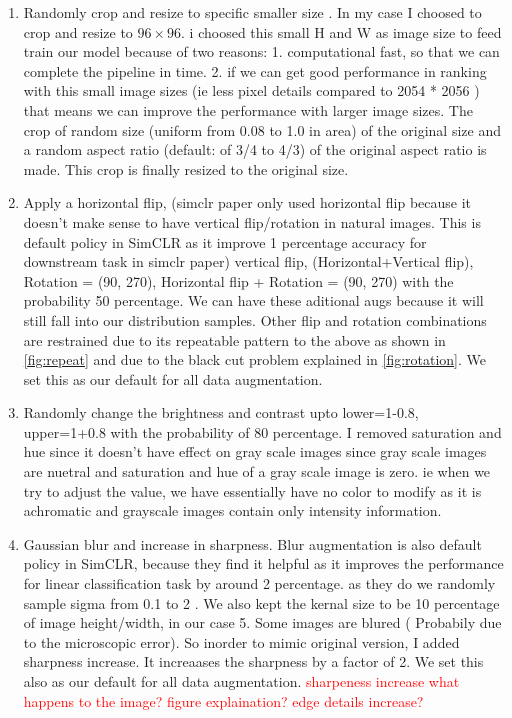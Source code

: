 \begin{enumerate}
  \item Randomly crop  and resize to specific smaller size . In my case I choosed to crop and resize to $96 \times 96$. i choosed this small H and W as 
  image size to feed train our model because of two reasons: 1. computational fast, so that we can complete the pipeline in time. 2. if we can get good performance
   in ranking with this small image sizes (ie less pixel details compared to 2054 * 2056 ) that means we can improve the performance with larger image sizes. The
   crop of random size (uniform from 0.08 to 1.0 in area) of the original size and a random aspect ratio (default: of 3/4 to 4/3) of the original aspect ratio is 
   made. This crop is finally resized to the original size.

  \item Apply a horizontal flip, (simclr paper only used horizontal flip because it doesn't make sense to have vertical flip/rotation in natural images. This is 
  default policy in SimCLR as it improve 1 percentage accuracy for downstream task in simclr paper) vertical flip, (Horizontal+Vertical flip), Rotation = (90, 270), 
  Horizontal flip + Rotation = (90, 270) with the probability 50 percentage. We can have these aditional augs because it will  still fall into our distribution
  samples. Other flip and rotation combinations are restrained due to its repeatable pattern to the above as shown in \ref{fig:repeat} and due to the black cut 
  problem explained in \ref{fig:rotation}. We set this as our default for all data augmentation.

  \item Randomly change the brightness and contrast  upto lower=1-0.8, upper=1+0.8  with the probability of 80 percentage. I removed saturation and hue since it 
  doesn't have effect on gray scale images since gray scale images are  nuetral and saturation and hue of a gray scale image is zero. ie when we try
   to adjust the value, we have essentially have no color to modify as it is achromatic and  grayscale images contain only intensity information.
   
  
  \item Gaussian blur and increase in sharpness. Blur augmentation is also default policy in SimCLR, because they find it helpful as  it improves the performance 
  for linear classification task by around 2 percentage. as they do we randomly sample sigma from 0.1 to 2 . We also kept the kernal size to be 10 percentage of 
  image height/width, in our case 5. Some images are blured ( Probabily due to the microscopic error). So inorder to mimic original version, I added sharpness 
 increase. It increaases the sharpness by a factor of 2. We set this also as our default for all data augmentation. \textcolor{red}{sharpeness increase what happens
  to the image? figure explaination? edge details increase?} 
\end{enumerate}


